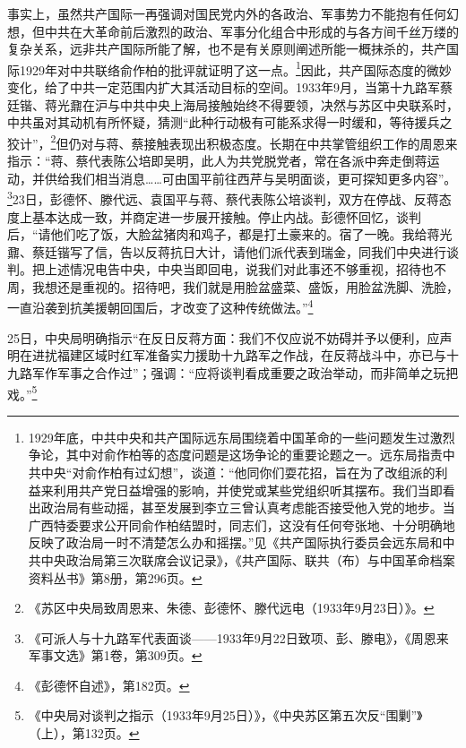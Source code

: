 事实上，虽然共产国际一再强调对国民党内外的各政治、军事势力不能抱有任何幻想，但中共在大革命前后激烈的政治、军事分化组合中形成的与各方间千丝万缕的复杂关系，远非共产国际所能了解，也不是有关原则阐述所能一概抹杀的，共产国际1929年对中共联络俞作柏的批评就证明了这一点。\footnote{1929年底，中共中央和共产国际远东局围绕着中国革命的一些问题发生过激烈争论，其中对俞作柏等的态度问题是这场争论的重要论题之一。远东局指责中共中央“对俞作柏有过幻想”，谈道：“他同你们耍花招，旨在为了改组派的利益来利用共产党日益增强的影响，并使党或某些党组织听其摆布。我们当即看出政治局有些动摇，甚至发展到李立三曾认真考虑能否接受他入党的地步。当广西特委要求公开同俞作柏结盟时，同志们，这没有任何夸张地、十分明确地反映了政治局一时不清楚怎么办和摇摆。”见《共产国际执行委员会远东局和中共中央政治局第三次联席会议记录》，《共产国际、联共（布）与中国革命档案资料丛书》第8册，第296页。}因此，共产国际态度的微妙变化，给了中共一定范围内扩大其活动目标的空间。1933年9月，当第十九路军蔡廷锴、蒋光鼐在沪与中共中央上海局接触始终不得要领，决然与苏区中央联系时，中共虽对其动机有所怀疑，猜测“此种行动极有可能系求得一时缓和，等待援兵之狡计”，\footnote{《苏区中央局致周恩来、朱德、彭德怀、滕代远电（1933年9月23日）》。}但仍对与蒋、蔡接触表现出积极态度。长期在中共掌管组织工作的周恩来指示：“蒋、蔡代表陈公培即吴明，此人为共党脱党者，常在各派中奔走倒蒋运动，并供给我们相当消息……可由国平前往西芹与吴明面谈，更可探知更多内容”。\footnote{《可派人与十九路军代表面谈——1933年9月22日致项、彭、滕电》，《周恩来军事文选》第1卷，第309页。}23日，彭德怀、滕代远、袁国平与蒋、蔡代表陈公培谈判，双方在停战、反蒋态度上基本达成一致，并商定进一步展开接触。停止内战。彭德怀回忆，谈判后，“请他们吃了饭，大脸盆猪肉和鸡子，都是打土豪来的。宿了一晚。我给蒋光鼐、蔡廷锴写了信，告以反蒋抗日大计，请他们派代表到瑞金，同我们中央进行谈判。把上述情况电告中央，中央当即回电，说我们对此事还不够重视，招待也不周，我想还是重视的。招待吧，我们就是用脸盆盛菜、盛饭，用脸盆洗脚、洗脸，一直沿袭到抗美援朝回国后，才改变了这种传统做法。”\footnote{《彭德怀自述》，第182页。}


25日，中央局明确指示“在反日反蒋方面：我们不仅应说不妨碍并予以便利，应声明在进扰福建区域时红军准备实力援助十九路军之作战，在反蒋战斗中，亦已与十九路军作军事之合作过”；强调：“应将谈判看成重要之政治举动，而非简单之玩把戏。”\footnote{《中央局对谈判之指示（1933年9月25日）》，《中央苏区第五次反“围剿”》（上），第132页。}


